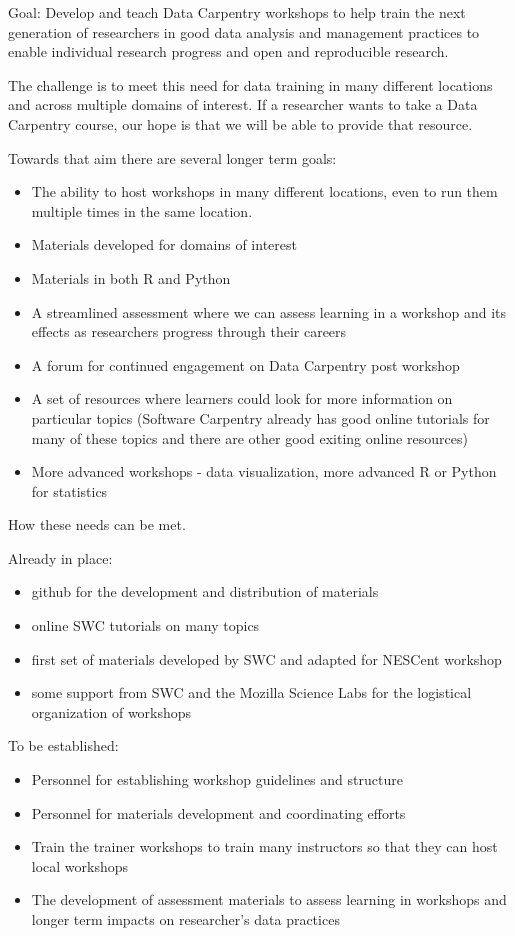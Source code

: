 \documentclass[11pt]{article}
\begin{document}
\hangindent=0.7cm Goal: Develop and teach Data Carpentry workshops to help train the next generation of researchers in good data analysis and management practices to enable individual research progress and open and reproducible research. 

The challenge is to meet this need for data training in many different locations and across multiple domains of interest.
 If a researcher wants to take a Data Carpentry course, our hope is that we will be able to provide that resource. 
 
Towards that aim there are several longer term goals:

\begin{itemize}
\item The ability to host workshops in many different locations, even to run
them multiple times in the same location. 
\item Materials developed for domains of interest 
\item Materials in both R and Python 
\item A streamlined assessment where we can assess learning in a workshop and its effects
as researchers progress through their careers
\item A forum for continued engagement on Data Carpentry post workshop
\item A set of resources where learners could look for more information on particular topics
(Software Carpentry already has good online tutorials for many of these topics and there are other good exiting online resources)
\item More advanced workshops - data visualization, more advanced R or Python for statistics
\end{itemize}


How these needs can be met.

Already in place:
\begin{itemize}
\item github for the development and distribution of materials
\item online SWC tutorials on many topics
\item first set of materials developed by SWC and adapted for NESCent workshop
\item some support from SWC and the Mozilla Science Labs for the logistical organization of workshops
\end{itemize}

To be established:
\begin{itemize}
\item Personnel for establishing workshop guidelines and structure
\item Personnel for materials development and coordinating efforts
\item Train the trainer workshops to train many instructors so that they can host local
workshops
\item The development of assessment materials to assess learning in workshops and longer term impacts on 
researcher's data practices
\end{itemize}
\end{document}
